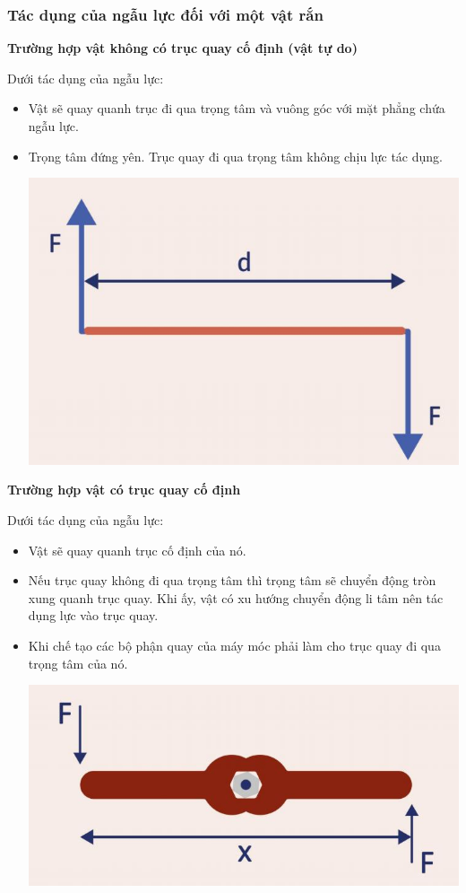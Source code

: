 \subsubsection{Tác dụng của ngẫu lực đối với một vật rắn}
\textbf{Trường hợp vật không có trục quay cố định (vật tự do)}

Dưới tác dụng của ngẫu lực:
\begin{itemize}
	\item  Vật sẽ quay quanh trục đi qua trọng tâm và vuông góc với mặt phẳng chứa ngẫu lực.
	\item Trọng tâm đứng yên. Trục quay đi qua trọng tâm không chịu lực tác dụng.
	\begin{center}
		\includegraphics[scale=0.4]{../figs/VN10-PH-25-L-020-1-V2-01.JPG}
	\end{center}	
\end{itemize}
\textbf{Trường hợp vật có trục quay cố định}

Dưới tác dụng của ngẫu lực:
\begin{itemize}
	\item  Vật sẽ quay quanh trục cố định của nó. 
	\item Nếu trục quay không đi qua trọng tâm thì trọng tâm sẽ chuyển động tròn xung quanh trục quay. Khi ấy, vật có xu hướng chuyển động li tâm nên tác dụng lực vào trục quay.
	\item Khi chế tạo các bộ phận quay của máy móc phải làm cho trục quay đi qua trọng tâm của nó.
	\begin{center}
		\includegraphics[scale=0.4]{../figs/VN10-PH-25-L-020-1-V2-02.JPG}
	\end{center}
\end{itemize}

